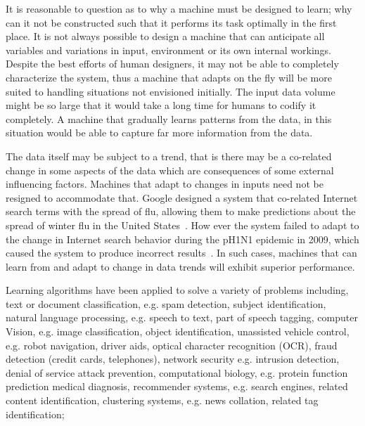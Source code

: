 It is reasonable to question as to why a machine must be designed to learn; why can it not be constructed such that it performs its task optimally in the first place. It is not always possible to design a machine that can anticipate all variables and variations in input, environment or its own internal workings. Despite the best efforts of human designers, it may not be able to completely characterize the system, thus a machine that adapts on the fly will be more suited to handling situations not envisioned initially. The input data volume might be so large that it would take a long time for humans to codify it completely. A machine that gradually learns patterns from the data, in this situation would be able to capture far more information from the data.

The data itself may be subject to a trend, that is there may be a co-related change in some aspects of the data which are consequences of some external influencing factors. Machines that adapt to changes in inputs need not be resigned to accommodate that. Google designed a system that co-related Internet search terms with the spread of flu, allowing them to make predictions about the spread of winter flu in the United States~\cite{ginsberg2008detecting}. How ever the system failed to adapt to the change in Internet search behavior during the pH1N1 epidemic in 2009, which caused the system to produce incorrect results~\cite{10.1371/journal.pone.0023610}. In such cases, machines that can learn from and adapt to change in data trends will exhibit superior performance. 




Learning algorithms have been applied to solve a variety of problems including, text or document classification, e.g. spam detection, subject identification, natural language processing, e.g. speech to text, part of speech tagging, computer Vision, e.g. image classification, object identification, unassisted vehicle control, e.g. robot navigation, driver aids, optical character recognition (OCR), fraud detection (credit cards, telephones), network security e.g. intrusion detection, denial of service attack prevention, computational biology, e.g. protein function prediction medical diagnosis, recommender systems, e.g. search engines, related content identification, clustering systems, e.g. news collation, related tag identification;




